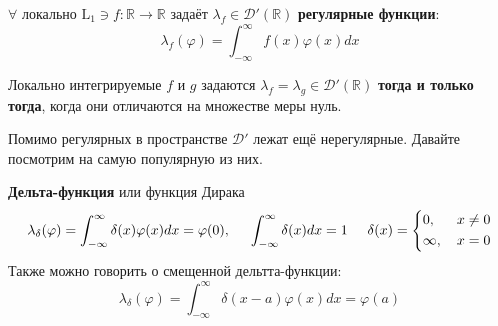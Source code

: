 \begin{to_def}
	$\forall$ локально $\text{L}_1 \ni f \colon \mathbb{R} \to \mathbb{R}$ задаёт $\lambda_f \in \mathcal{D}'(\mathbb{R})$ \textbf{регулярные функции}:
	\begin{equation*}
		\lambda_f(\varphi) = \int_{-\infty}^{\infty} f(x) \varphi(x) d x
	\end{equation*}
\end{to_def}

\begin{to_lem}
	Локально интегрируемые $f$ и $g$ задаются $\lambda_f = \lambda_g \in \mathcal{D}'(\mathbb{R})$ \textbf{тогда и только тогда}, когда они отличаются на множестве меры нуль. 
\end{to_lem}

Помимо регулярных в пространстве $\mathcal{D}'$ лежат ещё нерегулярные. Давайте посмотрим на самую популярную из них.

\begin{to_def}
	\textbf{Дельта-функция} или функция Дирака
	\begin{equation*}
		\lambda_\delta (\varphi)= \int_{-\infty}^{\infty} \delta(x) \varphi(x) d x = \varphi(0),
		\hspace{0.5 cm}
		\int_{-\infty}^{\infty} \delta(x) d x = 1
		\hspace{0.5 cm}
		\delta(x) = \left\{
		\begin{aligned}
			&0, \, &x \neq 0\\
			&\infty, \, &x = 0
		\end{aligned}\right.
	\end{equation*}
	Также можно говорить о смещенной дельтта-функции:
	\begin{equation*}
		\lambda_\delta (\varphi) = \int_{-\infty}^{\infty} \delta(x-a) \varphi(x) d x = \varphi(a)
	\end{equation*}
\end{to_def}